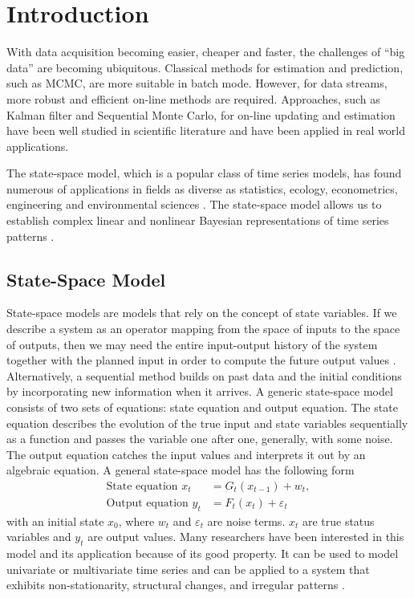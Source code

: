 
\section{Introduction}

With data acquisition becoming easier, cheaper and faster, the challenges of ``big data'' are becoming ubiquitous. Classical methods for estimation and prediction, such as MCMC, are more suitable in batch mode. However, for data streams, more robust and efficient on-line methods are required. Approaches, such as Kalman filter and Sequential Monte Carlo, for on-line updating and estimation have been well studied in scientific literature and have been applied in real world applications.

The state-space model, which is a popular class of time series models, has found numerous of applications in fields as diverse as statistics, ecology, econometrics, engineering and environmental sciences \citep{cappe2009inference, smcmip2011, elliott1995estimation, cargnoni1997bayesian}. The state-space model allows us to establish complex linear and nonlinear Bayesian representations of time series patterns \citep{vieira2016online}. 


\subsection*{State-Space Model}

State-space models are models that rely on the concept of state variables. If we describe a system as an operator mapping from the space of inputs to the space of outputs, then we may need the entire input-output history of the system together with the planned input in order to compute the future output values \citep{hangos2006analysis}. Alternatively, a sequential method builds on past data and the initial conditions by incorporating new information when it arrives. A generic state-space model consists of two sets of equations: state equation and output equation. The state equation describes the evolution of the true input and state variables sequentially as a function and passes the variable one after one, generally, with some noise. The output equation catches the input values and interprets it out by an algebraic equation. A general state-space model has the following form 
\begin{align}\label{statemodel1}
\mbox{State equation } x_t &= G_t(x_{t-1})+w_t,\\
\label{statemodel2}
\mbox{Output equation } y_t &=F_t(x_t)+\varepsilon_t
\end{align}
with an initial state $x_0$, where $w_t$ and $\varepsilon_t$ are noise terms. $x_t$ are true status variables and $y_t$ are output values. Many researchers have been interested in this model and its application because of its good property. It can be used to model univariate or multivariate time series and can be applied to a system that exhibits non-stationarity, structural changes, and irregular patterns \citep{petris2009dynamic}.

